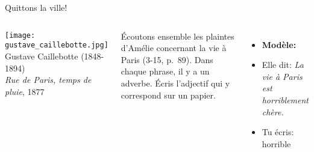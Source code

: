 \begin{frame}{Quittons la ville!}
  \begin{columns}
      \begin{center}
        \small
        \texttt{[image: gustave\_caillebotte.jpg]} \\
        Gustave Caillebotte (1848-1894) \\
        \emph{Rue de Paris, temps de pluie}, 1877
      \end{center}
      Écoutons ensemble les plaintes d'Amélie concernant la vie à Paris (3-15, p.~89).
      Dans chaque phrase, il y a un adverbe.
      Écris l'adjectif qui y correspond sur un papier.
      \begin{itemize}
        \item \textbf{Modèle:}
        \item Elle dit: \emph{La vie à Paris est horriblement chère.}
        \item Tu écris: horrible
      \end{itemize}
  \end{columns}
\end{frame}